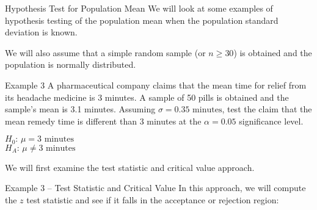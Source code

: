 \documentclass[t]{beamer}
\begin{document}
\begin{frame}{Hypothesis Test for Population Mean}
We will look at some examples of hypothesis testing of the population mean when the population standard deviation is known.	\newline\\	\pause

We will also assume that a simple random sample (or $n \geq 30$) is obtained and the population is normally distributed.
\end{frame}

\begin{frame}{Example 3}
A pharmaceutical company claims that the mean time for relief from its headache medicine is 3 minutes. A sample of 50 pills is obtained and the sample's mean is 3.1 minutes. Assuming $\sigma = 0.35\text{ minutes}$, test the claim that the mean remedy time is different than 3 minutes at the $\alpha = 0.05$ significance level.	\newline\\	\pause

$H_0: \, \mu = 3\text{ minutes}$ \newline\\
$H_A: \, \mu \neq 3\text{ minutes}$ \newline\\	\pause

We will first examine the test statistic and critical value approach.
\end{frame}

\begin{frame}{Example 3 -- Test Statistic and Critical Value}
In this approach, we will compute the $z$ test statistic and see if it falls in the acceptance or rejection region:	\newline\\
\begin{center}
\end{center}
\end{frame}
\end{document}
